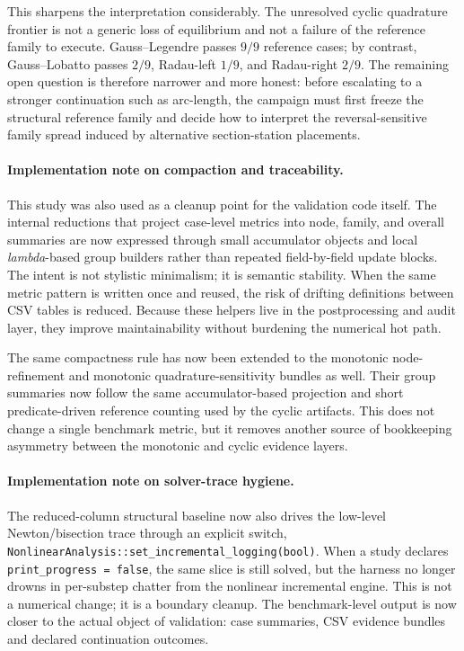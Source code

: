 This sharpens the interpretation considerably.  The unresolved cyclic
quadrature frontier is not a generic loss of equilibrium and not a failure of
the reference family to execute.  Gauss--Legendre passes \(9/9\) reference
cases; by contrast, Gauss--Lobatto passes \(2/9\), Radau-left \(1/9\), and
Radau-right \(2/9\).  The remaining open question is therefore narrower and
more honest: before escalating to a stronger continuation such as arc-length,
the campaign must first freeze the structural reference family and decide how
to interpret the reversal-sensitive family spread induced by alternative
section-station placements.

\paragraph{Implementation note on compaction and traceability.}
This study was also used as a cleanup point for the validation code itself.
The internal reductions that project case-level metrics into node, family, and
overall summaries are now expressed through small accumulator objects and local
\emph{lambda}-based group builders rather than repeated field-by-field update
blocks.  The intent is not stylistic minimalism; it is semantic stability.
When the same metric pattern is written once and reused, the risk of drifting
definitions between CSV tables is reduced.  Because these helpers live in the
postprocessing and audit layer, they improve maintainability without burdening
the numerical hot path.

The same compactness rule has now been extended to the monotonic
node-refinement and monotonic quadrature-sensitivity bundles as well.  Their
group summaries now follow the same accumulator-based projection and short
predicate-driven reference counting used by the cyclic artifacts.  This does
not change a single benchmark metric, but it removes another source of
bookkeeping asymmetry between the monotonic and cyclic evidence layers.

\paragraph{Implementation note on solver-trace hygiene.}
The reduced-column structural baseline now also drives the low-level
Newton/bisection trace through an explicit switch,
\texttt{NonlinearAnalysis::set\_incremental\_logging(bool)}.  When a study
declares \texttt{print\_progress = false}, the same slice is still solved, but
the harness no longer drowns in per-substep chatter from the nonlinear
incremental engine.  This is not a numerical change; it is a boundary cleanup.
The benchmark-level output is now closer to the actual object of validation:
case summaries, CSV evidence bundles and declared continuation outcomes.

